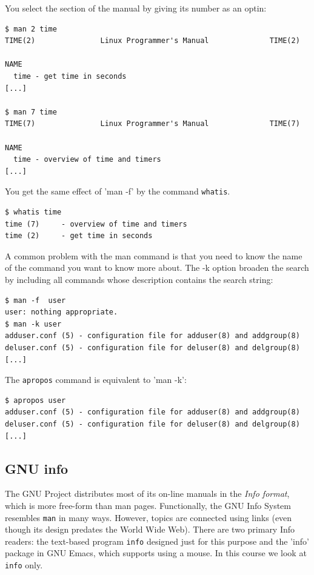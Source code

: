 \documentclass[11pt,a4paper,twoside]{article}
\begin{document}
You select the section of the manual by giving its number as an optin:

\begin{lstlisting}[frame=single]
$ man 2 time
TIME(2)               Linux Programmer's Manual              TIME(2)

NAME
  time - get time in seconds
[...]

$ man 7 time
TIME(7)               Linux Programmer's Manual              TIME(7)

NAME
  time - overview of time and timers
[...]
\end{lstlisting}

You get the same effect of 'man -f' by the command \texttt{whatis}.

\begin{lstlisting}[frame=single]
$ whatis time
time (7)     - overview of time and timers
time (2)     - get time in seconds
\end{lstlisting}

A common problem with the man command is that you need to know the
name of the command you want to know more about. The -k option broaden
the search by including all commands whose description contains the
search string:

\begin{lstlisting}[frame=single]
$ man -f  user
user: nothing appropriate.
$ man -k user
adduser.conf (5) - configuration file for adduser(8) and addgroup(8)
deluser.conf (5) - configuration file for deluser(8) and delgroup(8)
[...]
\end{lstlisting}

The \texttt{apropos} command is equivalent to 'man -k':
\begin{lstlisting}[frame=single]
$ apropos user
adduser.conf (5) - configuration file for adduser(8) and addgroup(8)
deluser.conf (5) - configuration file for deluser(8) and delgroup(8)
[...]
\end{lstlisting}


\subsection{GNU info}

The GNU Project distributes most of its on-line manuals in the
\emph{Info format}, which is more free-form than man pages.
Functionally, the GNU Info System resembles \texttt{man} in many ways. 
However, topics are connected using links (even though its design predates
the World Wide Web). There are two primary Info readers: the text-based
program \texttt{info} designed just for this purpose and the 'info'
package in GNU Emacs, which supports using a mouse. In this course we
look at \texttt{info} only.
\end{document}
